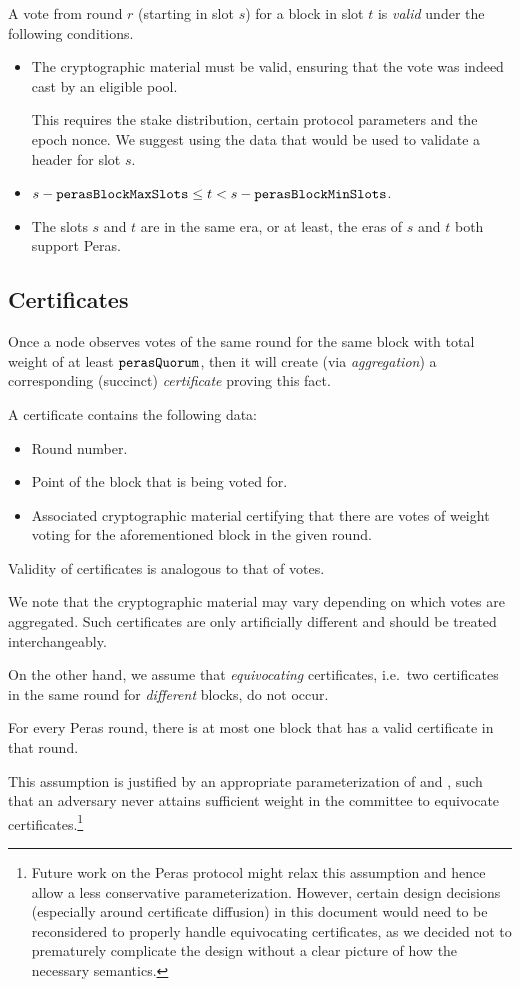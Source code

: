 A vote from round $r$ (starting in slot $s$) for a block in slot $t$ is \emph{valid} under the following conditions.
\begin{itemize}
\item
  The cryptographic material must be valid, ensuring that the vote was indeed cast by an eligible pool.

  This requires the stake distribution, certain protocol parameters and the epoch nonce.
  We suggest using the data that would be used to validate a header for slot $s$.
\item
  $s - \mathtt{perasBlockMaxSlots} \le t < s - \mathtt{perasBlockMinSlots}$.
\item
  The slots $s$ and $t$ are in the same era, or at least, the eras of $s$ and $t$ both support Peras.
\end{itemize}

\subsection{Certificates}\label{sec:certificate generalities}

Once a node observes votes of the same round for the same block with total weight of at least $\mathtt{perasQuorum}$, then it will create (via \emph{aggregation}) a corresponding (succinct) \emph{certificate} proving this fact.

A certificate contains the following data:
\begin{itemize}
\item Round number.
\item Point of the block that is being voted for.
\item Associated cryptographic material certifying that there are votes of weight \perasQuorum{} voting for the aforementioned block in the given round.
\end{itemize}

Validity of certificates is analogous to that of votes.

We note that the cryptographic material may vary depending on which votes are aggregated.
Such certificates are only artificially different and should be treated interchangeably.

On the other hand, we assume that \emph{equivocating} certificates, i.e.\ two certificates in the same round for \emph{different} blocks, do not occur.
\begin{tcolorbox}[title=Assumption]
  For every Peras round, there is at most one block that has a valid certificate in that round.
\end{tcolorbox}
This assumption is justified by an appropriate parameterization of \perasQuorum{} and \perasN{}, such that an adversary never attains sufficient weight in the committee to equivocate certificates.\footnote{Future work on the Peras protocol might relax this assumption and hence allow a less conservative parameterization.
  However, certain design decisions (especially around certificate diffusion) in this document would need to be reconsidered to properly handle equivocating certificates, as we decided not to prematurely complicate the design without a clear picture of how the necessary semantics.}

